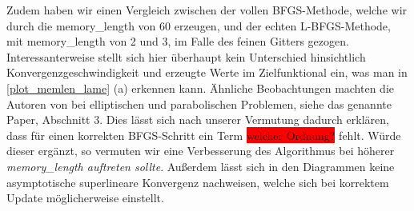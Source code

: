 Zudem haben wir einen Vergleich zwischen der vollen BFGS-Methode, welche wir durch die \textsf{memory\_length} von 60 erzeugen, und der echten L-BFGS-Methode, mit \textsf{memory\_length} von 2 und 3, im Falle des feinen Gitters gezogen. Interessanterweise stellt sich hier überhaupt kein Unterschied hinsichtlich Konvergenzgeschwindigkeit und erzeugte Werte im Zielfunktional ein, was man in \ref{plot_memlen_lame} (a) erkennen kann. Ähnliche Beobachtungen machten die Autoren von \cite{diffusion} bei elliptischen und parabolischen Problemen, siehe das genannte Paper, Abschnitt 3. Dies lässt sich nach unserer Vermutung dadurch erklären, dass für einen korrekten BFGS-Schritt ein Term \colorbox{red}{ welcher Ordnung?} fehlt. Würde dieser ergänzt, so vermuten wir eine Verbesserung des Algorithmus bei höherer \textit{memory\_length auftreten sollte}. Außerdem lässt sich in den Diagrammen keine asymptotische superlineare Konvergenz nachweisen, welche sich bei korrektem Update möglicherweise einstellt.

